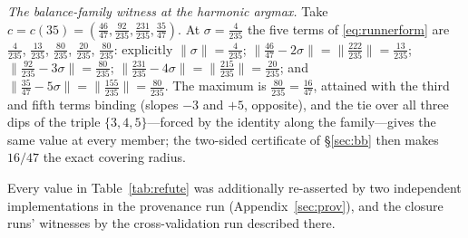 \documentclass[11pt,a4paper]{article}
\numberwithin{equation}{section}
\theoremstyle{plain}
\theoremstyle{definition}
\theoremstyle{remark}
\newcommand{\wnc}[1]{\lVert #1 \rVert}
\begin{document}
\emph{The balance-family witness at the harmonic argmax.} Take
$c=c(35)=(\tfrac{46}{47},\tfrac{92}{235},\tfrac{231}{235},
\tfrac{35}{47})$. At $\sigma=\tfrac{4}{235}$ the five terms of
\eqref{eq:runnerform} are $\tfrac{4}{235}$, $\tfrac{13}{235}$,
$\tfrac{80}{235}$, $\tfrac{20}{235}$, $\tfrac{80}{235}$: explicitly
$\wnc\sigma=\tfrac4{235}$;
$\wnc{\tfrac{46}{47}-2\sigma}=\wnc{\tfrac{222}{235}}=\tfrac{13}{235}$;
$\wnc{\tfrac{92}{235}-3\sigma}=\tfrac{80}{235}$;
$\wnc{\tfrac{231}{235}-4\sigma}=\wnc{\tfrac{215}{235}}=\tfrac{20}{235}$;
and $\wnc{\tfrac{35}{47}-5\sigma}=\wnc{\tfrac{155}{235}}=\tfrac{80}{235}$.
The maximum is $\tfrac{80}{235}=\tfrac{16}{47}$, attained with the
third and fifth terms binding (slopes $-3$ and $+5$, opposite), and the
tie over all three dips of the triple $\{3,4,5\}$---forced by the
identity along the family---gives the same value at every member; the
two-sided certificate of \S\ref{sec:bb} then makes $16/47$ the exact
covering radius.

Every value in
Table~\ref{tab:refute} was additionally re-asserted by two independent
implementations in the provenance run (Appendix~\ref{sec:prov}), and
the closure runs' witnesses by the cross-validation run described
there.


\end{document}
